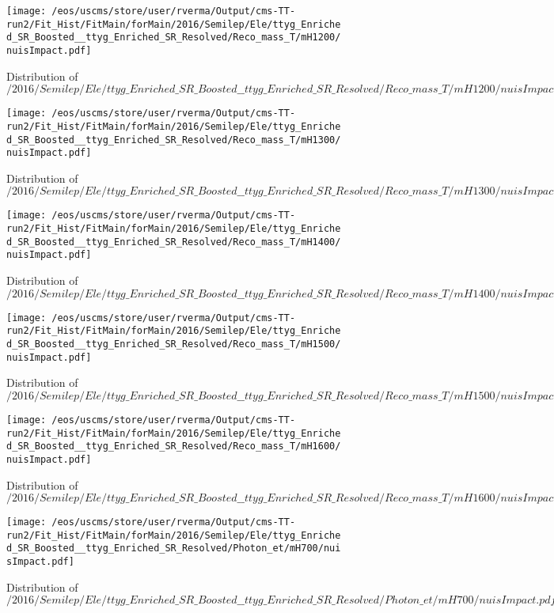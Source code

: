 \begin{figure}
\centering
\texttt{[image: /eos/uscms/store/user/rverma/Output/cms-TT-run2/Fit\_Hist/FitMain/forMain/2016/Semilep/Ele/ttyg\_Enriched\_SR\_Boosted\_\_ttyg\_Enriched\_SR\_Resolved/Reco\_mass\_T/mH1200/nuisImpact.pdf]}
\caption{Distribution of $/2016/Semilep/Ele/ttyg\_Enriched\_SR\_Boosted\_\_ttyg\_Enriched\_SR\_Resolved/Reco\_mass\_T/mH1200/nuisImpact.pdf$}
\end{figure}

\begin{figure}
\centering
\texttt{[image: /eos/uscms/store/user/rverma/Output/cms-TT-run2/Fit\_Hist/FitMain/forMain/2016/Semilep/Ele/ttyg\_Enriched\_SR\_Boosted\_\_ttyg\_Enriched\_SR\_Resolved/Reco\_mass\_T/mH1300/nuisImpact.pdf]}
\caption{Distribution of $/2016/Semilep/Ele/ttyg\_Enriched\_SR\_Boosted\_\_ttyg\_Enriched\_SR\_Resolved/Reco\_mass\_T/mH1300/nuisImpact.pdf$}
\end{figure}

\begin{figure}
\centering
\texttt{[image: /eos/uscms/store/user/rverma/Output/cms-TT-run2/Fit\_Hist/FitMain/forMain/2016/Semilep/Ele/ttyg\_Enriched\_SR\_Boosted\_\_ttyg\_Enriched\_SR\_Resolved/Reco\_mass\_T/mH1400/nuisImpact.pdf]}
\caption{Distribution of $/2016/Semilep/Ele/ttyg\_Enriched\_SR\_Boosted\_\_ttyg\_Enriched\_SR\_Resolved/Reco\_mass\_T/mH1400/nuisImpact.pdf$}
\end{figure}

\begin{figure}
\centering
\texttt{[image: /eos/uscms/store/user/rverma/Output/cms-TT-run2/Fit\_Hist/FitMain/forMain/2016/Semilep/Ele/ttyg\_Enriched\_SR\_Boosted\_\_ttyg\_Enriched\_SR\_Resolved/Reco\_mass\_T/mH1500/nuisImpact.pdf]}
\caption{Distribution of $/2016/Semilep/Ele/ttyg\_Enriched\_SR\_Boosted\_\_ttyg\_Enriched\_SR\_Resolved/Reco\_mass\_T/mH1500/nuisImpact.pdf$}
\end{figure}

\begin{figure}
\centering
\texttt{[image: /eos/uscms/store/user/rverma/Output/cms-TT-run2/Fit\_Hist/FitMain/forMain/2016/Semilep/Ele/ttyg\_Enriched\_SR\_Boosted\_\_ttyg\_Enriched\_SR\_Resolved/Reco\_mass\_T/mH1600/nuisImpact.pdf]}
\caption{Distribution of $/2016/Semilep/Ele/ttyg\_Enriched\_SR\_Boosted\_\_ttyg\_Enriched\_SR\_Resolved/Reco\_mass\_T/mH1600/nuisImpact.pdf$}
\end{figure}

\begin{figure}
\centering
\texttt{[image: /eos/uscms/store/user/rverma/Output/cms-TT-run2/Fit\_Hist/FitMain/forMain/2016/Semilep/Ele/ttyg\_Enriched\_SR\_Boosted\_\_ttyg\_Enriched\_SR\_Resolved/Photon\_et/mH700/nuisImpact.pdf]}
\caption{Distribution of $/2016/Semilep/Ele/ttyg\_Enriched\_SR\_Boosted\_\_ttyg\_Enriched\_SR\_Resolved/Photon\_et/mH700/nuisImpact.pdf$}
\end{figure}

